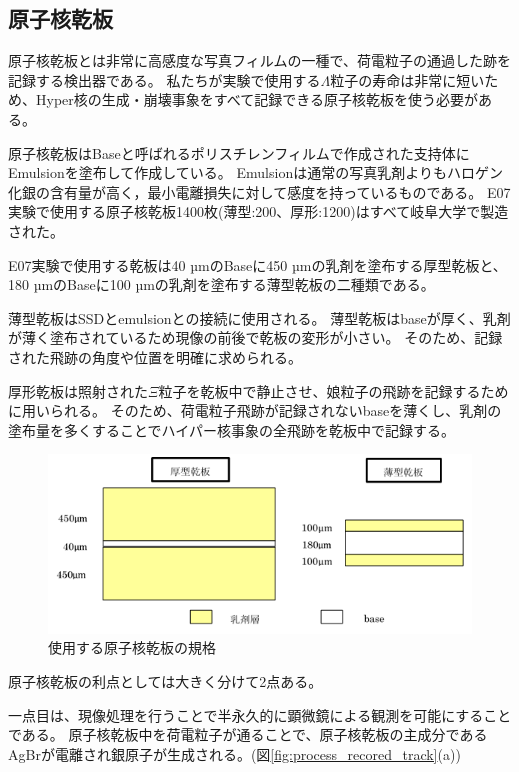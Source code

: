 \documentclass[12pt,a4paper]{jarticle}
\begin{document}
\subsection{原子核乾板}
原子核乾板とは非常に高感度な写真フィルムの一種で、荷電粒子の通過した跡を記録する検出器である。
私たちが実験で使用する$\Lambda$粒子の寿命は非常に短いため、Hyper核の生成・崩壊事象をすべて記録できる原子核乾板を使う必要がある。
\par
原子核乾板はBaseと呼ばれるポリスチレンフィルムで作成された支持体にEmulsionを塗布して作成している。
Emulsionは通常の写真乳剤よりもハロゲン化銀の含有量が高く，最小電離損失に対して感度を持っているものである。
E07実験で使用する原子核乾板1400枚(薄型:200、厚形:1200)はすべて岐阜大学で製造された。
\par
E07実験で使用する乾板は40 µmのBaseに450 µmの乳剤を塗布する厚型乾板と、180 µmのBaseに100 µmの乳剤を塗布する薄型乾板の二種類である。
\par
薄型乾板はSSDとemulsionとの接続に使用される。
薄型乾板はbaseが厚く、乳剤が薄く塗布されているため現像の前後で乾板の変形が小さい。
そのため、記録された飛跡の角度や位置を明確に求められる。
\par
厚形乾板は照射された$\Xi$粒子を乾板中で静止させ、娘粒子の飛跡を記録するために用いられる。
そのため、荷電粒子飛跡が記録されないbaseを薄くし、乳剤の塗布量を多くすることでハイパー核事象の全飛跡を乾板中で記録する。
\par
\begin{figure}[htbp]
  \centering
     \includegraphics[width=140mm]{emulsionorder.png}
  \caption{使用する原子核乾板の規格\label{fig:emulsionorder}}
\end{figure}
\par
\newpage
原子核乾板の利点としては大きく分けて2点ある。
\par
一点目は、現像処理を行うことで半永久的に顕微鏡による観測を可能にすることである。
原子核乾板中を荷電粒子が通ることで、原子核乾板の主成分であるAgBrが電離され銀原子が生成される。(図\ref{fig:process_recored_track}(a))
\end{document}
